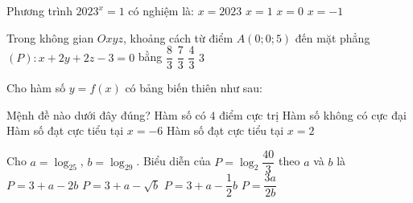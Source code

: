 \begin{ex}%
	Phương trình $2023^x=1$ có nghiệm là:
	\choice
	{$x=2023$}
	{$x=1$}
	{\True $x=0$}
	{$x=-1$}
\end{ex}

\begin{ex}%
	Trong không gian $Oxyz$, khoảng cách từ điểm $A(0;0;5)$ đến mặt phẳng $(P)\colon x+2y+2z-3=0$ bằng
	\choice
	{$\dfrac{8}{3}$}
	{\True $\dfrac{7}{3}$}
	{$\dfrac{4}{3}$}
	{$3$}
\end{ex}

\begin{ex}%
	Cho hàm số $y=f(x)$ có bảng biến thiên như sau:
	\begin{center}
	\end{center}
	Mệnh đề nào dưới đây đúng?
	\choice
	{Hàm số có $4$ điểm cực trị}
	{Hàm số không có cực đại}
	{Hàm số đạt cực tiểu tại $x=-6$}
	{\True Hàm số đạt cực tiểu tại $x=2$}
\end{ex}

\begin{ex}%
	Cho $a=\log _25$, $b=\log _29$. Biểu diễn của $P=\log _2\dfrac{40}{3}$ theo $a$ và $b$ là
	\choice
	{$P=3+a-2b$}
	{$P=3+a-\sqrt{b}$}
	{\True $P=3+a-\dfrac{1}{2}b$}
	{$P=\dfrac{3a}{2b}$}
\end{ex}

